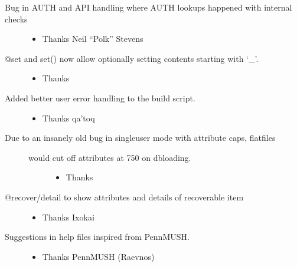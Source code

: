 \documentclass[letterpaper,10pt,english]{sphinxmanual}
\begin{document}
\begin{description}
\begin{itemize}
\end{itemize}

\item[{Bug in AUTH and API handling where AUTH lookups happened with internal checks}] \leavevmode\begin{itemize}
\item {} 
\sphinxAtStartPar
Thanks Neil “Polk” Stevens

\end{itemize}

\item[{@set and set() now allow optionally setting contents starting with ‘\_’.}] \leavevmode\begin{itemize}
\item {} 
\sphinxAtStartPar
Thanks 

\end{itemize}

\item[{Added better user error handling to the build script.}] \leavevmode\begin{itemize}
\item {} 
\sphinxAtStartPar
Thanks qa’toq

\end{itemize}

\item[{Due to an insanely old bug in singleuser mode with attribute caps, flatfiles}] \leavevmode\begin{description}
\item[{would cut off attributes at 750 on dbloading.}] \leavevmode\begin{itemize}
\item {} 
\sphinxAtStartPar
Thanks 

\end{itemize}

\end{description}

\item[{@recover/detail to show attributes and details of recoverable item}] \leavevmode\begin{itemize}
\item {} 
\sphinxAtStartPar
Thanks Ixokai

\end{itemize}

\item[{Suggestions in help files inspired from PennMUSH.}] \leavevmode\begin{itemize}
\item {} 
\sphinxAtStartPar
Thanks PennMUSH (Raevnos)


\end{itemize}
\end{description}
\end{document}
